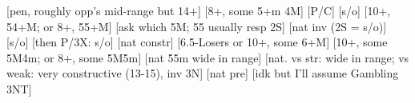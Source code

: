 \begin{bidsemi}
[pen, roughly opp's mid-range but 14+]
[8+, some 5+m 4M]
    [P/C]
    [s/o]
[10+, 54+M; or 8+, 55+M]
    [ask which 5M; 55 usually resp 2S]
        [nat inv (2S = s/o)]
    [s/o]
    [then P/3X: s/o]
    [nat constr]
[6.5-Losers or 10+, some 6+M]
[10+, some 5M4m; or 8+, some 5M5m]
[nat 55m wide in range]
[nat. vs str: wide in range; vs weak: very constructive (13-15), inv 3N]
[nat pre]
[idk but I'll assume Gambling 3NT]
\end{bidsemi}